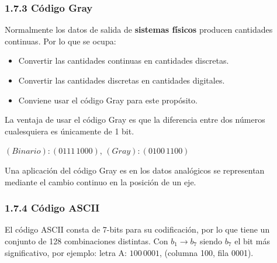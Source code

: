 \documentclass{article}
\begin{document}
\subsubsection*{1.7.3 C\'{o}digo Gray}
Normalmente los datos de salida de \textbf{sistemas f\'{i}sicos} producen cantidades
continuas. Por lo que se ocupa:
\begin{itemize}
    \small
    \item Convertir las cantidades continuas en cantidades discretas.
    \item Convertir las cantidades discretas en cantidades digitales.
    \item Conviene usar el c\'{o}digo Gray para este prop\'{o}sito.
\end{itemize}
\medbreak

\begin{center}
\end{center}
\medskip
\normalsize

La ventaja de usar el c\'{o}digo Gray es que la diferencia entre dos n\'{u}meros cualesquiera
es \'{u}nicamente de 1 bit.
\begin{center}
    $(Binario): (0111\,1000)$, $(Gray): (0100\,1100)$
\end{center}

Una aplicaci\'{o}n del c\'{o}digo Gray es en los datos anal\'{o}gicos se representan
mediante el cambio continuo en la posici\'{o}n de un eje.

\subsubsection*{1.7.4 C\'{o}digo ASCII}
El c\'{o}digo ASCII consta de 7-bits para su codificaci\'{o}n, por lo que tiene un conjunto
de 128 combinaciones distintas. Con $b_1 \rightarrow b_7$ siendo $b_7$ el bit m\'{a}s significativo,
por ejemplo: letra A: $100\,0001$, (columna 100, fila 0001).
\end{document}
